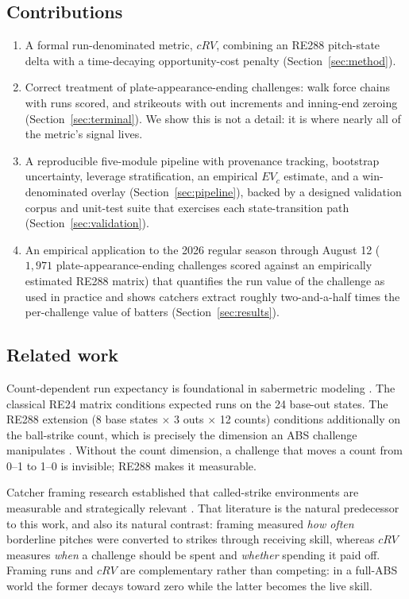 \subsection{Contributions}
\begin{enumerate}
  \item A formal run-denominated metric, $cRV$, combining an RE288 pitch-state
        delta with a time-decaying opportunity-cost penalty
        (Section~\ref{sec:method}).
  \item Correct treatment of plate-appearance-ending challenges: walk force
        chains with runs scored, and strikeouts with out increments and
        inning-end zeroing (Section~\ref{sec:terminal}). We show this is not a
        detail: it is where nearly all of the metric's signal lives.
  \item A reproducible five-module pipeline with provenance tracking, bootstrap
        uncertainty, leverage stratification, an empirical $EV_c$ estimate, and
        a win-denominated overlay (Section~\ref{sec:pipeline}), backed by a
        designed validation corpus and unit-test suite that exercises each
        state-transition path (Section~\ref{sec:validation}).
  \item An empirical application to the 2026 regular season through
        August 12 ($1{,}971$ plate-appearance-ending challenges scored against
        an empirically estimated RE288 matrix) that
        quantifies the run value of the challenge as used in practice and shows
        catchers extract roughly two-and-a-half times the per-challenge value
        of batters (Section~\ref{sec:results}).
\end{enumerate}

\subsection{Related work}
Count-dependent run expectancy is foundational in sabermetric modeling
\citep{tango2007}. The classical RE24 matrix conditions expected runs on the 24
base-out states. The RE288 extension (8 base states $\times$ 3 outs $\times$
12 counts) conditions additionally on the ball-strike count, which is
precisely the dimension an ABS challenge manipulates
\citep{tangotiger2018}. Without the count dimension, a challenge that
moves a count from 0--1 to 1--0 is invisible; RE288 makes it measurable.

Catcher framing research established that called-strike environments are
measurable and strategically relevant \citep{marchi2013,fast2011,mlbframing}.
That literature is the natural predecessor to this work, and also its natural
contrast: framing measured \emph{how often} borderline pitches were converted
to strikes through receiving skill, whereas $cRV$ measures \emph{when} a
challenge should be spent and \emph{whether} spending it paid off. Framing runs
and $cRV$ are complementary rather than competing: in a full-ABS world the
former decays toward zero while the latter becomes the live skill.

